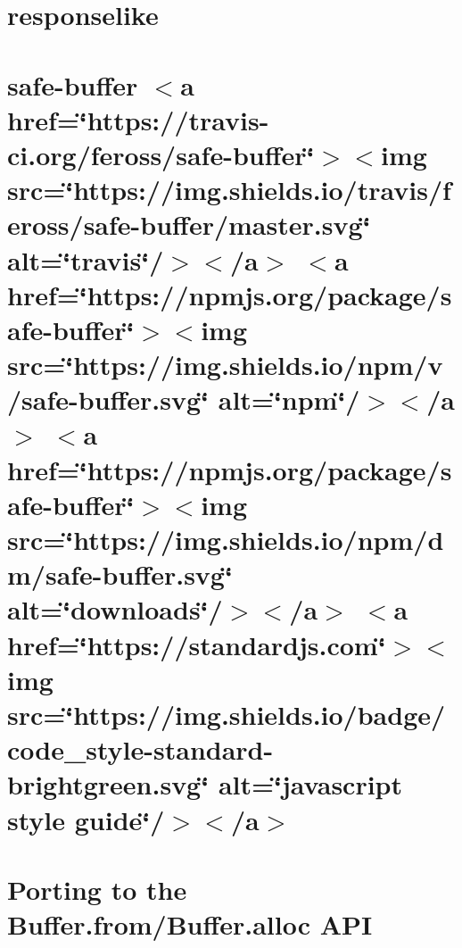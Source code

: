 \let\mypdfximage\pdfximage\def\pdfximage{\immediate\mypdfximage}\documentclass[twoside]{book}
\newcommand{\+}{\discretionary{\mbox{\scriptsize$\hookleftarrow$}}{}{}}
\begin{document}
\chapter{responselike}
\label{md__c_1__git_hub__p_r_o_y_e_c_t_o-_i_i_i-_g_o_t_rest-api_node_modules_responselike__r_e_a_d_m_e}

\chapter{safe-\/buffer $<$a href=\char`\"{}https\+://travis-\/ci.\+org/feross/safe-\/buffer\char`\"{}$>$$<$img src=\char`\"{}https\+://img.\+shields.\+io/travis/feross/safe-\/buffer/master.\+svg\char`\"{} alt=\char`\"{}travis\char`\"{}/$>$$<$/a$>$ $<$a href=\char`\"{}https\+://npmjs.\+org/package/safe-\/buffer\char`\"{}$>$$<$img src=\char`\"{}https\+://img.\+shields.\+io/npm/v/safe-\/buffer.\+svg\char`\"{} alt=\char`\"{}npm\char`\"{}/$>$$<$/a$>$ $<$a href=\char`\"{}https\+://npmjs.\+org/package/safe-\/buffer\char`\"{}$>$$<$img src=\char`\"{}https\+://img.\+shields.\+io/npm/dm/safe-\/buffer.\+svg\char`\"{} alt=\char`\"{}downloads\char`\"{}/$>$$<$/a$>$ $<$a href=\char`\"{}https\+://standardjs.\+com\char`\"{}$>$$<$img src=\char`\"{}https\+://img.\+shields.\+io/badge/code\+\_\+style-\/standard-\/brightgreen.\+svg\char`\"{} alt=\char`\"{}javascript style guide\char`\"{}/$>$$<$/a$>$}
\label{md__c_1__git_hub__p_r_o_y_e_c_t_o-_i_i_i-_g_o_t_rest-api_node_modules_safe-buffer__r_e_a_d_m_e}

\chapter{Porting to the Buffer.\+from/\+Buffer.alloc A\+PI}
\label{md__c_1__git_hub__p_r_o_y_e_c_t_o-_i_i_i-_g_o_t_rest-api_node_modules_safer-buffer__porting-_buffer}

\end{document}
